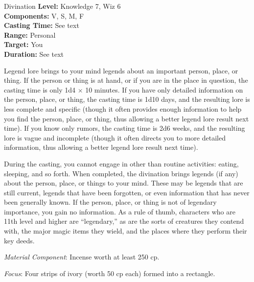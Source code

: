 {Divination}
{
	\textbf{Level:}
	Knowledge 7, Wiz 6\\
	\textbf{Components:}
	V, S, M, F\\
	\textbf{Casting Time:}
	See text\\
	\textbf{Range:}
	Personal\\
	\textbf{Target:}
	You\\
	\textbf{Duration:}
	See text\\
}
{
	Legend lore brings to your mind legends about an important person, place, or thing. If the person or thing is at hand, or if you are in the place in question, the casting time is only 1d4 $\times$ 10 minutes. If you have only detailed information on the person, place, or thing, the casting time is 1d10 days, and the resulting lore is less complete and specific (though it often provides enough information to help you find the person, place, or thing, thus allowing a better legend lore result next time). If you know only rumors, the casting time is 2d6 weeks, and the resulting lore is vague and incomplete (though it often directs you to more detailed information, thus allowing a better legend lore result next time).

	During the casting, you cannot engage in other than routine activities: eating, sleeping, and so forth. When completed, the divination brings legends (if any) about the person, place, or things to your mind. These may be legends that are still current, legends that have been forgotten, or even information that has never been generally known. If the person, place, or thing is not of legendary importance, you gain no information. As a rule of thumb, characters who are 11th level and higher are ``legendary,'' as are the sorts of creatures they contend with, the major magic items they wield, and the places where they perform their key deeds.

	\textit{Material Component}:
	Incense worth at least 250 cp.

	\textit{Focus}:
	Four strips of ivory (worth 50 cp each) formed into a rectangle.

}

